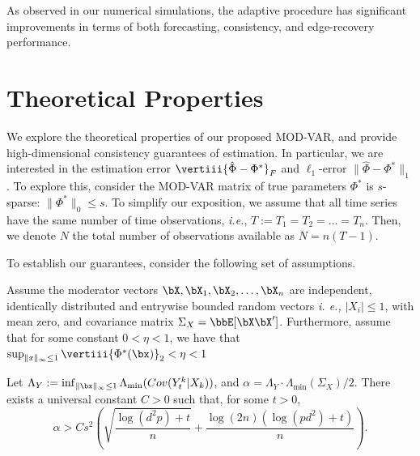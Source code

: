 As observed in our numerical simulations, the adaptive procedure has significant improvements in terms of both forecasting, consistency, and edge-recovery performance. 


\section{Theoretical Properties}\label{section:theory}


We explore the theoretical properties of our proposed MOD-VAR, and provide high-dimensional consistency guarantees of estimation. In particular, we are interested in the estimation error $\vertiii{\hat\Phi - \Phi^*}_F$ and $\ell_1$-error $\|\hat\Phi - \Phi^*\|_{1}$. To explore this, consider the MOD-VAR matrix of true parameters $\Phi^*$ is $s$-sparse: $\|\Phi^*\|_0 \leq s$. To simplify our exposition, we assume that all time series have the same number of time observations, \textit{i.e.}, $T := T_1 = T_2 = \ldots = T_n$. Then, we denote $N$ the total number of observations available as $N = n(T-1)$. 



To establish our guarantees, consider the following set of assumptions. 

\begin{assumption}\label{as:boundedModEffect}
    Assume the moderator vectors $\bX,\bX_1,\bX_2,\ldots , \bX_n$ are independent, identically distributed and entrywise bounded random vectors \textit{i. e.,} $|X_{i}| \leq 1$, with mean zero, and covariance matrix $\Sigma_X = \bbE[\bX\bX']$. Furthermore, assume that for some constant $0< \eta < 1$, we have that $\sup_{\|x\|_\infty \leq 1} \vertiii{\Phi^*(\bx)}_2 < \eta < 1 $
\end{assumption}

\begin{assumption}\label{as:boundedEigenvalue}
     Let $\Lambda_{Y} := \inf_{\|\bx\|_\infty \leq 1} \Lambda_{\min}( Cov(Y_t^k | X_k) )$, and $\alpha = \Lambda_{Y} \cdot \Lambda_{\min}(\Sigma_X) / 2$. There exists a universal constant $C > 0$ such that, for some $t > 0$, 
     \begin{equation*}
         \alpha > C s^2 \left(\sqrt{\frac{\log(d^2p) + t}{n}}  + \frac{\log(2n)(\log(pd^2) + t)}{n}\right).
     \end{equation*}
\end{assumption}

